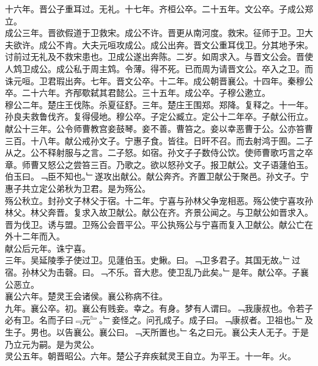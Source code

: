 \documentclass{zhvt-classic}
\begin{document}
\hspace*{2em}十六年。晋公子重耳过。无礼。十七年。齐桓公卒。二十五年。文公卒。子成公郑立。\\
\hspace*{2em}成公三年。晋欲假道于卫救宋。成公不许。晋更从南河度。救宋。征师于卫。卫大夫欲许。成公不肯。大夫元咺攻成公。成公出奔。晋文公重耳伐卫。分其地予宋。讨前过无礼及不救宋患也。卫成公遂出奔陈。二岁。如周求入。与晋文公会。晋使人鸩卫成公。成公私于周主鸩。令薄。得不死。已而周为请晋文公。卒入之卫。而诛元咺。卫君瑕出奔。七年。晋文公卒。十二年。成公朝晋襄公。十四年。秦穆公卒。二十六年。齐邴歜弑其君懿公。三十五年。成公卒。子穆公遬立。\\
\hspace*{2em}穆公二年。楚庄王伐陈。杀夏征舒。三年。楚庄王围郑。郑降。复释之。十一年。孙良夫救鲁伐齐。复得侵地。穆公卒。子定公臧立。定公十二年卒。子献公衎立。\\
\hspace*{2em}献公十三年。公令师曹教宫妾鼓琴。妾不善。曹笞之。妾以幸恶曹于公。公亦笞曹三百。十八年。献公戒孙文子。宁惠子食。皆往。日旰不召。而去射鸿于囿。二子从之。公不释射服与之言。二子怒。如宿。孙文子子数侍公饮。使师曹歌巧言之卒章。师曹又怒公之尝笞三百。乃歌之。欲以怒孙文子。报卫献公。文子语蘧伯玉。伯玉曰。﹁臣不知也。﹂遂攻出献公。献公奔齐。齐置卫献公于聚邑。孙文子。宁惠子共立定公弟秋为卫君。是为殇公。\\
\hspace*{2em}殇公秋立。封孙文子林父于宿。十二年。宁喜与孙林父争宠相恶。殇公使宁喜攻孙林父。林父奔晋。复求入故卫献公。献公在齐。齐景公闻之。与卫献公如晋求入。晋为伐卫。诱与盟。卫殇公会晋平公。平公执殇公与宁喜而复入卫献公。献公亡在外十二年而入。\\
\hspace*{2em}献公后元年。诛宁喜。\\
\hspace*{2em}三年。吴延陵季子使过卫。见蘧伯玉。史鳅。曰。﹁卫多君子。其国无故。﹂过宿。孙林父为击磬。曰。﹁不乐。音大悲。使卫乱乃此矣。﹂是年。献公卒。子襄公恶立。\\
\hspace*{2em}襄公六年。楚灵王会诸侯。襄公称病不往。\\
\hspace*{2em}九年。襄公卒。初。襄公有贱妾。幸之。有身。梦有人谓曰。﹁我康叔也。令若子必有卫。名而子曰﹃元﹄。﹂妾怪之。问孔成子。成子曰。﹁康叔者。卫祖也。﹂及生子。男也。以告襄公。襄公曰。﹁天所置也。﹂名之曰元。襄公夫人无子。于是乃立元为嗣。是为灵公。\\
\hspace*{2em}灵公五年。朝晋昭公。六年。楚公子弃疾弑灵王自立。为平王。十一年。火。\\
\end{document}
